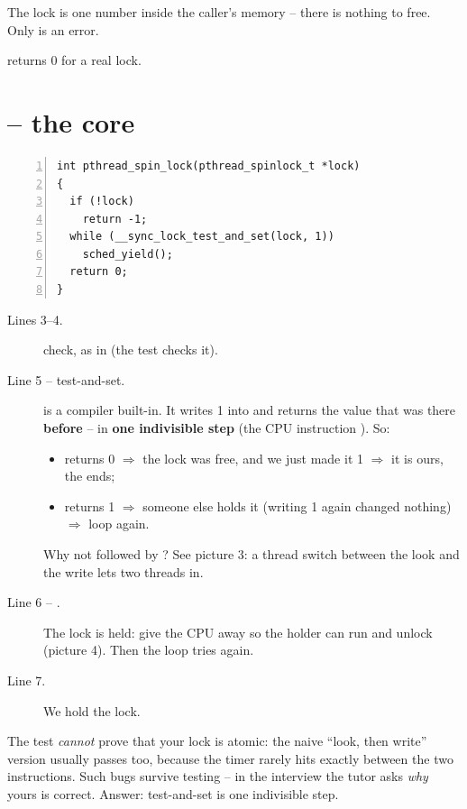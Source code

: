 \documentclass[11pt]{report}
\newcommand{\done}[1]{\begin{keybox}[title={Done when}]#1\end{keybox}}
\begin{document}
The lock is one number inside the caller's memory -- there is nothing to free. Only  is an error.

\done{ returns 0 for a real lock.}

\section{ -- the core \hfill {\normalsize{}}}

\begin{lstlisting}[numbers=left,numberstyle=\tiny\color{headgray}]
int pthread_spin_lock(pthread_spinlock_t *lock)
{
  if (!lock)
    return -1;
  while (__sync_lock_test_and_set(lock, 1))
    sched_yield();
  return 0;
}
\end{lstlisting}

\begin{description}
  \item[Lines 3--4.]  check, as in  (the test checks it).
  \item[Line 5 -- test-and-set.]  is a compiler built-in. It
        writes 1 into  and returns the value that was there \textbf{before} -- in \textbf{one
        indivisible step} (the CPU instruction ). So:
        \begin{itemize}
          \item returns 0 $\Rightarrow$ the lock was free, and we just made it 1 $\Rightarrow$ it is ours,
                the  ends;
          \item returns 1 $\Rightarrow$ someone else holds it (writing 1 again changed nothing)
                $\Rightarrow$ loop again.
        \end{itemize}
        Why not  followed by ? See picture 3: a thread switch
        between the look and the write lets two threads in.
  \item[Line 6 -- .] The lock is held: give the CPU away so the holder can run and
        unlock (picture 4). Then the loop tries again.
  \item[Line 7.] We hold the lock.
\end{description}

\begin{trapbox}
The test \emph{cannot} prove that your lock is atomic: the naive ``look, then write'' version usually
passes too, because the timer rarely hits exactly between the two instructions. Such bugs survive
testing -- in the interview the tutor asks \emph{why} yours is correct. Answer: test-and-set is one
indivisible step.
\end{trapbox}
\end{document}
